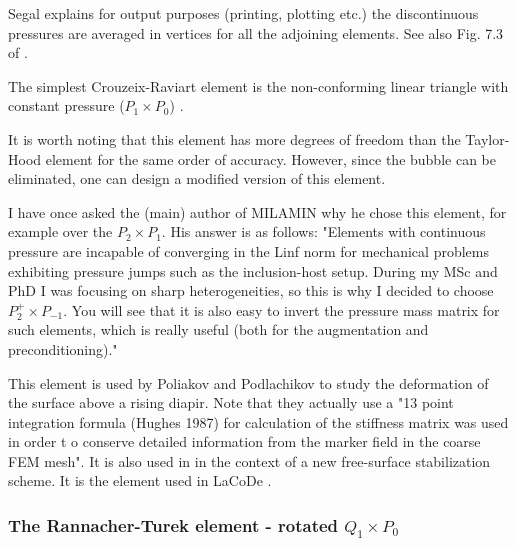 \begin{remark}
Segal \cite{segal} explains 
for output purposes (printing, plotting etc.) the discontinuous pressures are averaged 
in vertices for all the adjoining elements. See also Fig. 7.3 of \cite{cuss86}.
\end{remark}

\begin{remark}
The simplest Crouzeix-Raviart element is the non-conforming linear triangle 
with constant pressure ($P_1\times P_0$) \cite{cuss86}. 
\end{remark}

It is worth noting that this element has more degrees of freedom  than the 
Taylor-Hood element for the same order of accuracy. However, since the 
bubble can be eliminated, one can design a modified version of this element.


\begin{remark}
I have once asked the (main) author of MILAMIN why he chose this element, for 
example over the $P_2\times P_1$. His answer is as follows:
"Elements with continuous pressure  are incapable of converging in the Linf 
norm for mechanical problems exhibiting pressure jumps such as the inclusion-host setup. 
During my MSc and PhD I was focusing on sharp heterogeneities, so this is why I decided 
to choose $P_2^+\times P_{-1}$. 
You will see that it is also easy to invert the pressure mass matrix for such elements, 
which is really useful (both for the augmentation and preconditioning)."
\end{remark}

This element is used by Poliakov and Podlachikov \cite{popo92} to study the deformation of the surface above a rising diapir. Note that they actually use a "13 point integration formula (Hughes
1987) for calculation of the stiffness matrix was used in order
t o conserve detailed information from the marker field in
the coarse FEM mesh". 
It is also used in \cite{anmp15} in the context of a new free-surface stabilization scheme. 
It is the element used in LaCoDe \cite{demh19}.






\subsubsection{The Rannacher-Turek element - rotated $Q_1\times P_0$} \label{ss:RTq1p0}

